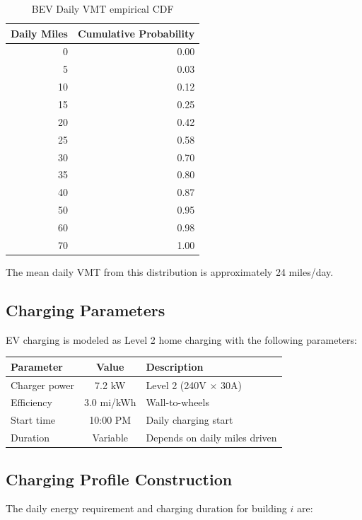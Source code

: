 \documentclass[11pt]{article}
\begin{document}
\begin{table}[htbp]
\centering
\caption{BEV Daily VMT empirical CDF}
\begin{tabular}{r r}
\toprule
\textbf{Daily Miles} & \textbf{Cumulative Probability} \\
\midrule
0 & 0.00 \\
5 & 0.03 \\
10 & 0.12 \\
15 & 0.25 \\
20 & 0.42 \\
25 & 0.58 \\
30 & 0.70 \\
35 & 0.80 \\
40 & 0.87 \\
50 & 0.95 \\
60 & 0.98 \\
70 & 1.00 \\
\bottomrule
\end{tabular}
\end{table}

The mean daily VMT from this distribution is approximately 24 miles/day.

\subsection{Charging Parameters}

EV charging is modeled as Level 2 home charging with the following parameters:

\begin{table}[htbp]
\centering
\begin{tabular}{l c l}
\toprule
\textbf{Parameter} & \textbf{Value} & \textbf{Description} \\
\midrule
Charger power & 7.2 kW & Level 2 (240V $\times$ 30A) \\
Efficiency & 3.0 mi/kWh & Wall-to-wheels \\
Start time & 10:00 PM & Daily charging start \\
Duration & Variable & Depends on daily miles driven \\
\bottomrule
\end{tabular}
\end{table}

\subsection{Charging Profile Construction}

The daily energy requirement and charging duration for building $i$ are:
\end{document}
